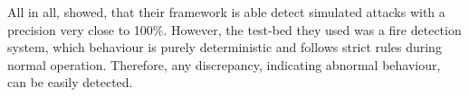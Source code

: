 All in all, \textcite{Pan2014} showed, that their framework is able detect simulated attacks with a precision very close to 100\%. However, the test-bed they used was a fire detection system, which behaviour is purely deterministic and follows strict rules during normal operation.
Therefore, any discrepancy, indicating abnormal behaviour, can be easily detected.





